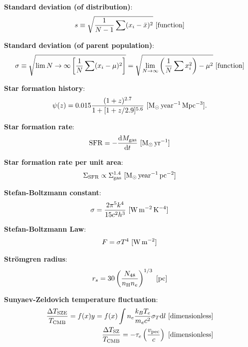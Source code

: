 \documentclass[a4paper,10pt]{article}
\begin{document}
{\noindent}\textbf{Standard deviation (of distribution)}:
\begin{align*}
    s \equiv \sqrt{\frac{1}{N-1} \sum (x_i-\bar{x})^2} ~ [{\rm function}]
\end{align*}

{\noindent}\textbf{Standard deviation (of parent population)}:
\begin{align*}
    \sigma \equiv \sqrt{\lim{N\rightarrow\infty} \left[\frac{1}{N}\sum(x_i-\mu)^2\right]} = \sqrt{\lim_{N\rightarrow\infty} \left(\frac{1}{N}\sum x_i^2\right)-\mu^2} ~ [{\rm function}]
\end{align*}

{\noindent}\textbf{Star formation history}:
\begin{align*}
    \psi(z) = 0.015\frac{(1+z)^{2.7}}{1+[1+z/2.9]^{5.6}} ~ [{\rm M_\odot\,year^{-1}\,Mpc^{-3}}].
\end{align*}

{\noindent}\textbf{Star formation rate}:
\begin{align*}
    \mathrm{SFR} = -\frac{\mathrm{d}M_\mathrm{gas}}{\mathrm{d}t} ~ [{\rm M_\odot\,yr^{-1}}]
\end{align*}

{\noindent}\textbf{Star formation rate per unit area}:
\begin{align*}
    \Sigma_\mathrm{SFR} \propto \Sigma_\mathrm{gas}^{1.4} ~ [{\rm M_\odot\,year^{-1}\,pc^{-2}}]
\end{align*}

{\noindent}\textbf{Stefan-Boltzmann constant}:
\begin{align*}
    \sigma = \frac{2\pi^5k^4}{15c^2h^3} ~ [{\rm W\,m^{-2}\,K^{-4}}]
\end{align*}

{\noindent}\textbf{Stefan-Boltzmann Law}:
\begin{align*}
    F = \sigma T^4 ~ [{\rm W\,m^{-2}}]
\end{align*}

{\noindent}\textbf{Str\"omgren radius}:
\begin{align*}
    r_s = 30 \left(\frac{N_{48}}{n_{\rm H}n_e}\right)^{1/3} ~ [{\rm pc}]
\end{align*}

{\noindent}\textbf{Sunyaev-Zeldovich temperature fluctuation}:
\begin{align*}
    \frac{\Delta T_\mathrm{SZE}}{T_\mathrm{CMB}} = f(x)y = f(x)\int n_e\frac{k_BT_e}{m_ec^2}\sigma_T \mathrm{d}l ~ [{\rm dimensionless}] \\
    \frac{\Delta T_\mathrm{SZ}}{T_\mathrm{CMB}} = -\tau_e \left(\frac{v_\mathrm{pec}}{c}\right) ~ [{\rm dimensionless}]
\end{align*}
\end{document}
